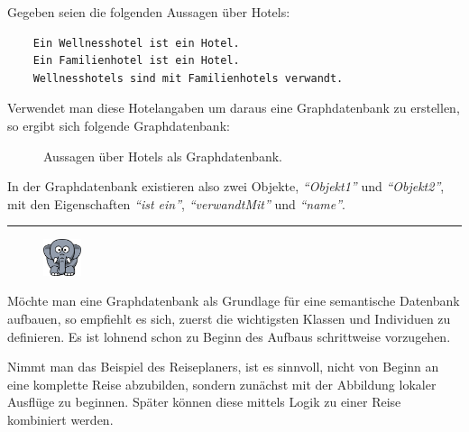 \newpage

Gegeben seien die folgenden Aussagen über Hotels:
\begin{lstlisting}
    Ein Wellnesshotel ist ein Hotel.
    Ein Familienhotel ist ein Hotel.
    Wellnesshotels sind mit Familienhotels verwandt.
\end{lstlisting}

Verwendet man diese Hotelangaben um daraus eine Graphdatenbank zu erstellen, so ergibt sich folgende Graphdatenbank:
\begin{figure}[htbp]
\centering {}
\caption{Aussagen über Hotels als Graphdatenbank.\label{fig:hotels_graphdatenbank}\protect\footnotemark}
\end{figure}

In der Graphdatenbank existieren also zwei Objekte, \textit{``Objekt1''} und \textit{``Objekt2''}, mit den Eigenschaften \textit{``ist ein''}, \textit{``verwandtMit''} und \textit{``name''}.

\newpage

\noindent\rule[1ex]{\textwidth}{1pt}
\begin{figure}
    \vspace{-12pt}
    \includegraphics[width=0.1\textwidth]{bilder/elephant.png}
\end{figure}
\label{elephant_graph_data}
Möchte man eine Graphdatenbank als Grundlage für eine semantische Datenbank aufbauen, so empfiehlt es sich, zuerst die wichtigsten Klassen und Individuen zu definieren. Es ist lohnend schon zu Beginn des Aufbaus schrittweise vorzugehen.

Nimmt man das Beispiel des Reiseplaners, ist es sinnvoll, nicht von Beginn an eine komplette Reise abzubilden, sondern zunächst mit der Abbildung lokaler Ausflüge zu beginnen. Später können diese mittels Logik zu einer Reise kombiniert werden.

